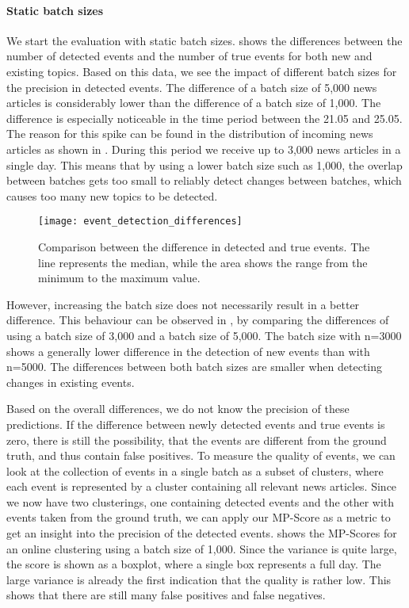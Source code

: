 \paragraph{Static batch sizes}
We start the evaluation with static batch sizes.
 shows the differences between the number of detected events
and the number of true events for both new and existing topics.
Based on this data, we see the impact of different batch sizes for the precision in detected events.
The difference of a batch size of 5,000 news articles is considerably lower than the difference of a batch size of 1,000.
The difference is especially noticeable in the time period between the 21.05 and 25.05.
The reason for this spike can be found in the distribution of incoming news articles
as shown in .
During this period we receive up to 3,000 news articles in a single day.
This means that by using a lower batch size such as 1,000,
the overlap between batches gets too small to reliably detect changes between batches,
which causes too many new topics to be detected.

\begin{figure}[h]
    \centering
    \texttt{[image: event\_detection\_differences]}
    \caption{
        Comparison between the difference in detected and true events.
        The line represents the median, while the area shows the range from the minimum to the maximum value.
    }
    \label{fig:event_detection_differences}
\end{figure}

However, increasing the batch size does not necessarily result in a better difference.
This behaviour can be observed in ,
by comparing the differences of using a batch size of 3,000 and a batch size of 5,000.
The batch size with n=3000 shows a generally lower difference in the detection of new events than with n=5000.
The differences between both batch sizes are smaller when detecting changes in existing events.

Based on the overall differences, we do not know the precision of these predictions.
If the difference between newly detected events and true events is zero,
there is still the possibility, that the events are different from the ground truth,
and thus contain false positives.
To measure the quality of events, we can look at the collection of events in a single batch as a subset of clusters,
where each event is represented by a cluster containing all relevant news articles.
Since we now have two clusterings, one containing detected events and the other with events taken from the ground truth,
we can apply our MP-Score as a metric to get an insight into the precision of the detected events.
 shows the MP-Scores for an online clustering using a batch size of 1,000.
Since the variance is quite large, the score is shown as a boxplot, where a single box represents a full day.
The large variance is already the first indication that the quality is rather low.
This shows that there are still many false positives and false negatives.

